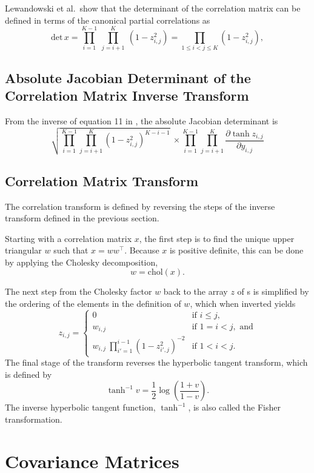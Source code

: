 Lewandowski et al.\ show that the determinant of the correlation
matrix can be defined in terms of the canonical partial correlations
as
%
\[
\mbox{det} \, x = \prod_{i=1}^{K-1} \ \prod_{j=i+1}^K \ (1 - z_{i,j}^2)
 = \prod_{1 \leq i < j \leq K} (1 - z_{i,j}^2),
\]

\subsection{Absolute Jacobian Determinant of the Correlation
  Matrix Inverse Transform}
From the inverse of equation 11 in \cite{LewandowskiKurowickaJoe:2009},
the absolute Jacobian determinant is
%
\[
\sqrt{\prod_{i=1}^{K-1}\prod_{j=i+1}^K \left(1-z_{i,j}^2\right)^{K-i-1}} \
\times \prod_{i=1}^{K-1}\prod_{j=i+1}^K
\frac{\partial \tanh z_{i,j}}{\partial y_{i,j}}
\]
\subsection{Correlation Matrix Transform}

The correlation transform is defined by reversing the steps of the
inverse transform defined in the previous section.

Starting with a correlation matrix $x$, the first step is to find the
unique upper triangular $w$ such that $x = w w^{\top}$.  Because $x$
is positive definite, this can be done by applying the Cholesky
decomposition,
\[
w = \mbox{chol}(x).
\]


The next step from the Cholesky factor $w$ back to the array $z$ of
{\CPC}s is simplified by the ordering of the elements in the
definition of $w$, which when inverted yields
%
\[
z_{i,j} =
\left\{
\begin{array}{cl}
0 & \mbox{if } i \leq j,
\\[8pt]
w_{i,j} & \mbox{if } 1 = i < j, \mbox{ and}
\\[8pt]
{w_{i,j}}
\
\prod_{i'=1}^{i-1} \left( 1 - z_{i'\!,j}^2 \right)^{-2}
& \mbox{if } 1 < i < j.
\end{array}
\right.
\]
The final stage of the transform reverses the hyperbolic tangent
transform, which is defined by
\[
\tanh^{-1} v = \frac{1}{2} \log \left( \frac{1 + v}{1 - v} \right).
\]
The inverse hyperbolic tangent function, $\tanh^{-1}$, is also called
the Fisher transformation.


\section{Covariance Matrices}

